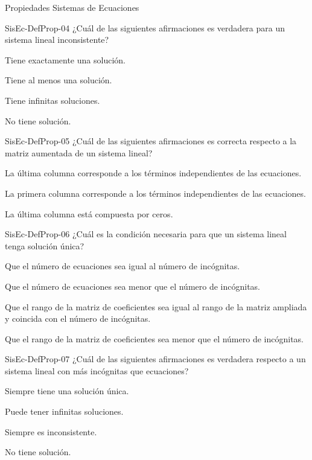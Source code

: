 \documentclass[a4,11pt]{aleph-notas}
\begin{document}
\begin{quiz}{Propiedades Sistemas de Ecuaciones}
    \begin{multi}[]%
    {SisEc-DefProp-04}
    ¿Cuál de las siguientes afirmaciones es verdadera para un sistema lineal inconsistente?
    \item Tiene exactamente una solución.
    \item Tiene al menos una solución.
    \item Tiene infinitas soluciones.
    \item* No tiene solución.
    \end{multi}
    
\begin{multi}[]%
    {SisEc-DefProp-05}
    ¿Cuál de las siguientes afirmaciones es correcta respecto a la matriz aumentada de un sistema lineal?
    \item* La última columna corresponde a los términos independientes de las ecuaciones.
    \item La primera columna corresponde a los términos independientes de las ecuaciones.
    \item La última columna está compuesta por ceros.
\end{multi}

\begin{multi}[]%
    {SisEc-DefProp-06}
    ¿Cuál es la condición necesaria para que un sistema lineal tenga solución única?
    \item Que el número de ecuaciones sea igual al número de incógnitas.
    \item Que el número de ecuaciones sea menor que el número de incógnitas.
    \item* Que el rango de la matriz de coeficientes sea igual al rango de la matriz ampliada y coincida con el número de incógnitas.
    \item Que el rango de la matriz de coeficientes sea menor que el número de incógnitas.
\end{multi}

\begin{multi}[]%
    {SisEc-DefProp-07}
    ¿Cuál de las siguientes afirmaciones es verdadera respecto a un sistema lineal con más incógnitas que ecuaciones?
    \item Siempre tiene una solución única.
    \item* Puede tener infinitas soluciones.
    \item Siempre es inconsistente.
    \item No tiene solución.
\end{multi}


\end{quiz}
\end{document}
